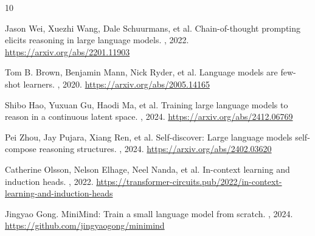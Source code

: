 \documentclass[11pt,a4paper]{article}
\begin{document}

\begin{thebibliography}{10}

Jason Wei, Xuezhi Wang, Dale Schuurmans, et al.
\newblock Chain-of-thought prompting elicits reasoning in large language models.
, 2022.
\newblock \url{https://arxiv.org/abs/2201.11903}

Tom B. Brown, Benjamin Mann, Nick Ryder, et al.
\newblock Language models are few-shot learners.
, 2020.
\newblock \url{https://arxiv.org/abs/2005.14165}

Shibo Hao, Yuxuan Gu, Haodi Ma, et al.
\newblock Training large language models to reason in a continuous latent space.
, 2024.
\newblock \url{https://arxiv.org/abs/2412.06769}

Pei Zhou, Jay Pujara, Xiang Ren, et al.
\newblock Self-discover: Large language models self-compose reasoning structures.
, 2024.
\newblock \url{https://arxiv.org/abs/2402.03620}

Catherine Olsson, Nelson Elhage, Neel Nanda, et al.
\newblock In-context learning and induction heads.
, 2022.
\newblock \url{https://transformer-circuits.pub/2022/in-context-learning-and-induction-heads}

Jingyao Gong.
\newblock MiniMind: Train a small language model from scratch.
, 2024.
\newblock \url{https://github.com/jingyaogong/minimind}

\end{thebibliography}
\end{document}
